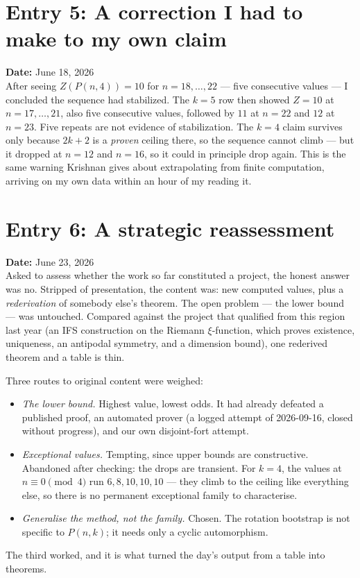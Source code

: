 \documentclass[12pt]{article}
\begin{document}
\section*{Entry 5: A correction I had to make to my own claim}
\textbf{Date:} June 18, 2026\\
After seeing $Z(P(n,4))=10$ for $n=18,\dots,22$ --- five consecutive values ---
I concluded the sequence had stabilized. The $k=5$ row then showed
$Z=10$ at $n=17,\dots,21$, also five consecutive values, followed by $11$ at
$n=22$ and $12$ at $n=23$. Five repeats are not evidence of stabilization. The
$k=4$ claim survives only because $2k+2$ is a \emph{proven} ceiling there, so
the sequence cannot climb --- but it dropped at $n=12$ and $n=16$, so it could
in principle drop again. This is the same warning Krishnan gives about
extrapolating from finite computation, arriving on my own data within an hour
of my reading it.



\clearpage
\section*{Entry 6: A strategic reassessment}
\textbf{Date:} June 23, 2026\\
Asked to assess whether the work so far constituted a project, the honest
answer was no. Stripped of presentation, the content was: new computed values,
plus a \emph{rederivation} of somebody else's theorem. The open problem --- the
lower bound --- was untouched. Compared against the project that qualified from
this region last year (an IFS construction on the Riemann $\xi$-function, which
proves existence, uniqueness, an antipodal symmetry, and a dimension bound),
one rederived theorem and a table is thin.

Three routes to original content were weighed:
\begin{itemize}
\item \emph{The lower bound.} Highest value, lowest odds. It had already
defeated a published proof, an automated prover (a logged attempt of
2026-09-16, closed without progress), and our own disjoint-fort attempt.
\item \emph{Exceptional values.} Tempting, since upper bounds are constructive.
Abandoned after checking: the drops are transient. For $k=4$, the values at
$n\equiv0\pmod4$ run $6,8,10,10,10$ --- they climb to the ceiling like
everything else, so there is no permanent exceptional family to characterise.
\item \emph{Generalise the method, not the family.} Chosen. The rotation
bootstrap is not specific to $P(n,k)$; it needs only a cyclic automorphism.
\end{itemize}
The third worked, and it is what turned the day's output from a table into
theorems.
\end{document}
